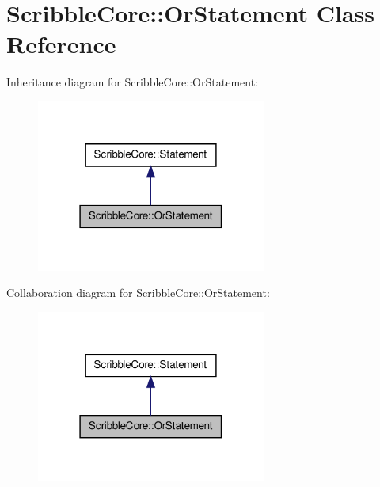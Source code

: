 \hypertarget{class_scribble_core_1_1_or_statement}{\section{Scribble\-Core\-:\-:Or\-Statement Class Reference}
\label{class_scribble_core_1_1_or_statement}
}


Inheritance diagram for Scribble\-Core\-:\-:Or\-Statement\-:\nopagebreak
\begin{figure}[H]
\begin{center}
\leavevmode
\includegraphics[width=214pt]{class_scribble_core_1_1_or_statement__inherit__graph}
\end{center}
\end{figure}


Collaboration diagram for Scribble\-Core\-:\-:Or\-Statement\-:\nopagebreak
\begin{figure}[H]
\begin{center}
\leavevmode
\includegraphics[width=214pt]{class_scribble_core_1_1_or_statement__coll__graph}
\end{center}
\end{figure}
